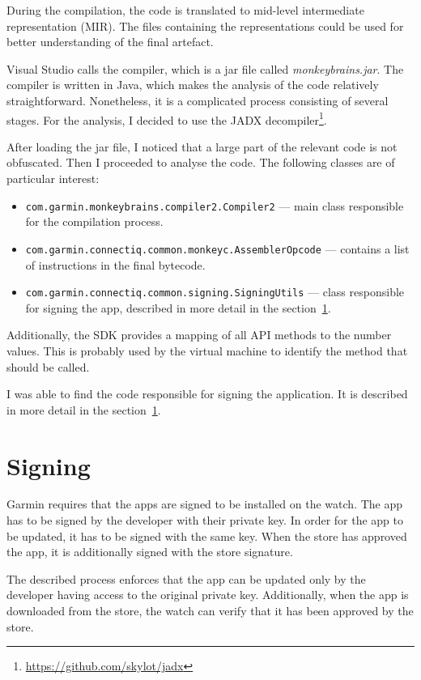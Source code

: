 During the compilation, the code is translated to mid-level intermediate representation (MIR).
The files containing the representations could be used for better understanding of the final artefact.

Visual Studio calls the compiler, which is a jar file called \textit{monkeybrains.jar}.
The compiler is written in Java, which makes the analysis of the code relatively straightforward.
Nonetheless, it is a complicated process consisting of several stages.
For the analysis, I decided to use the JADX decompiler\footnote{\url{https://github.com/skylot/jadx}}.

After loading the jar file, I noticed that a large part of the relevant code is not obfuscated.
Then I proceeded to analyse the code.
The following classes are of particular interest:
\begin{itemize}
    \item \texttt{com.garmin.monkeybrains.compiler2.Compiler2} — main class responsible for the compilation process.
    \item \texttt{com.garmin.connectiq.common.monkeyc.AssemblerOpcode} — contains a list of instructions in the final bytecode.
    \item \texttt{com.garmin.connectiq.common.signing.SigningUtils} — class responsible for signing the app, described in more detail in the section~\ref{subsec:signing}.
\end{itemize}
Additionally, the SDK provides a mapping of all API methods to the number values.
This is probably used by the virtual machine to identify the method that should be called.

I was able to find the code responsible for signing the application.
It is described in more detail in the section~\ref{subsec:signing}.

\section{Signing} \label{subsec:signing}
Garmin requires that the apps are signed to be installed on the watch\cite{garmin-signing}.
The app has to be signed by the developer with their private key.
In order for the app to be updated, it has to be signed with the same key.
When the store has approved the app, it is additionally signed with the store signature.

The described process enforces that the app can be updated only by the developer having access to the original private key.
Additionally, when the app is downloaded from the store, the watch can verify that it has been approved by the store.

